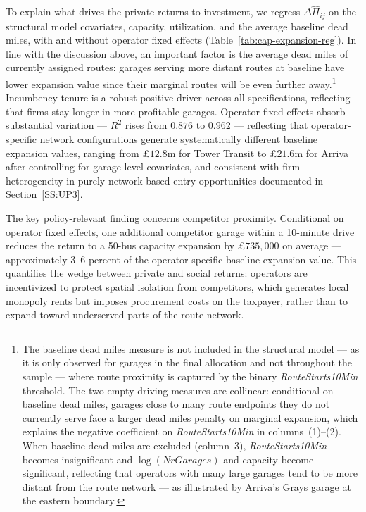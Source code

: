 \documentclass[12pt]{article}
\begin{document}
To explain what drives the private returns to investment, we regress
$\Delta\hat{\Pi}_{ij}$ on the structural model covariates, capacity,
utilization, and the average baseline dead miles, with and without operator
fixed effects (Table~\ref{tab:cap-expansion-reg}). In line with the
discussion above, an important factor is the average dead miles of currently
assigned routes: garages serving more distant routes at baseline have lower
expansion value since their marginal routes will be even further
away.\footnote{The baseline dead miles measure is not included in the
structural model --- as it is only observed for garages in the final
allocation and not throughout the sample --- where route proximity is
captured by the binary \textit{RouteStarts10Min} threshold. The two empty
driving measures are collinear: conditional on baseline dead miles, garages
close to many route endpoints they do not currently serve face a larger dead
miles penalty on marginal expansion, which explains the negative coefficient
on \textit{RouteStarts10Min} in columns~(1)--(2). When baseline dead miles
are excluded (column~3), \textit{RouteStarts10Min} becomes insignificant
and $\log(\textit{NrGarages})$ and capacity become significant, reflecting
that operators with many large garages tend to be more distant from the route
network --- as illustrated by Arriva's Grays garage at the eastern
boundary.} Incumbency tenure is a robust positive driver across all
specifications, reflecting that firms stay longer in more profitable garages.
Operator fixed effects absorb substantial variation --- $R^2$ rises from
$0.876$ to $0.962$ --- reflecting that operator-specific network
configurations generate systematically different baseline expansion values,
ranging from \pounds$12.8$m for Tower Transit to \pounds$21.6$m for Arriva
after controlling for garage-level covariates, and consistent with firm
heterogeneity in purely network-based entry opportunities documented in
Section~\ref{SS:UP3}.
 
The key policy-relevant finding concerns competitor proximity. Conditional on
operator fixed effects, one additional competitor garage within a 10-minute
drive reduces the return to a 50-bus capacity expansion by \pounds$735{,}000$
on average --- approximately 3--6 percent of the operator-specific baseline
expansion value. This quantifies the wedge between private and social
returns: operators are incentivized to protect spatial isolation from
competitors, which generates local monopoly rents but imposes procurement
costs on the taxpayer, rather than to expand toward underserved parts of the
route network.
 
\end{document}
